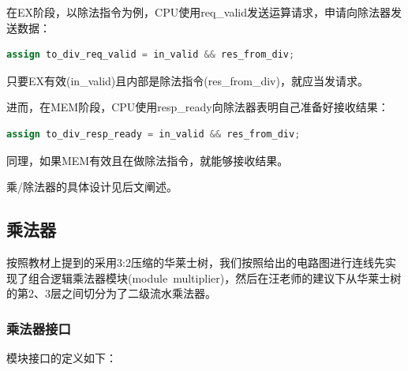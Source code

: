 \documentclass[11pt]{article}
\begin{document}
在EX阶段，以除法指令为例，CPU使用req_valid发送运算请求，申请向除法器发送数据：

\begin{lstlisting}[language=Verilog, caption={CPU的除法运算请求}]
assign to_div_req_valid = in_valid && res_from_div;
\end{lstlisting}
只要EX有效(in_valid)且内部是除法指令(res_from_div)，就应当发请求。

进而，在MEM阶段，CPU使用resp_ready向除法器表明自己准备好接收结果：
\begin{lstlisting}[language=Verilog, caption={CPU的除法运算接收准备}]
assign to_div_resp_ready = in_valid && res_from_div;
\end{lstlisting}
同理，如果MEM有效且在做除法指令，就能够接收结果。


乘/除法器的具体设计见后文阐述。




\subsection{乘法器}

按照教材上提到的采用3:2压缩的华莱士树，我们按照给出的电路图进行连线先实现了组合逻辑乘法器模块(module\  multiplier)，然后在汪老师的建议下从华莱士树的第2、3层之间切分为了二级流水乘法器。

\subsubsection{乘法器接口}

模块接口的定义如下：
\end{document}
